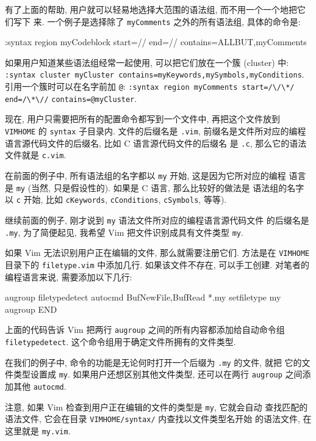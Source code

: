 有了上面的帮助, 用户就可以轻易地选择大范围的语法组, 而不用一个一个地把它们写下
来. 一个例子是选择除了 \texttt{myComments} 之外的所有语法组, 具体的命令是:
\begin{vimcode}
:syntax region myCodeblock start=/{/ end=/}/ contains=ALLBUT,myComments
\end{vimcode}

\begin{tips}
    如果用户知道某些语法组经常一起使用, 可以把它们放在一个簇 (cluster) 中:
    \texttt{:syntax cluster myCluster
    contains=myKeywords,mySymbols,myConditions}. 引用一个簇时可以在名字前加
    \verb'@': \texttt{:syntax region myComments start=}\verb'/\/\*/ end=/\*\//'
        \texttt{contains=@myCluster}.
\end{tips}

现在, 用户只需要把所有的配置命令都写到一个文件中, 再把这个文件放到
\texttt{VIMHOME} 的 \texttt{syntax} 子目录内. 文件的后缀名是 \texttt{.vim},
前缀名是文件所对应的编程语言源代码文件的后缀名, 比如 C 语言源代码文件的后缀名
是 \texttt{.c}, 那么它的语法文件就是 \texttt{c.vim}.

在前面的例子中, 所有语法组的名字都以 \texttt{my} 开始, 这是因为它所对应的编程
语言是 \texttt{my} (当然, 只是假设性的). 如果是 C 语言, 那么比较好的做法是
语法组的名字以 \texttt{c} 开始, 比如 \texttt{cKeywords}, \texttt{cConditions},
\texttt{cSymbols}, 等等).

继续前面的例子, 刚才说到 \texttt{my} 语法文件所对应的编程语言源代码文件
的后缀名是 \texttt{.my}, 为了简便起见, 我希望 Vim 把文件识别成具有文件类型
\texttt{my}.

如果 Vim 无法识别用户正在编辑的文件, 那么就需要注册它们. 方法是在
\texttt{VIMHOME} 目录下的 \texttt{filetype.vim} 中添加几行. 如果该文件不存在,
可以手工创建. 对笔者的编程语言来说, 需要添加以下几行:
\begin{vimcode}
augroup filetypedetect
autocmd BufNewFile,BufRead *.my setfiletype my
augroup END
\end{vimcode}
上面的代码告诉 Vim 把两行 \texttt{augroup} 之间的所有内容都添加给自动命令组
\texttt{filetypedetect}. 这个命令组用于确定文件所拥有的文件类型.

在我们的例子中, 命令的功能是无论何时打开一个后缀为 \texttt{.my} 的文件, 就把
它的文件类型设置成 \texttt{my}. 如果用户还想区别其他文件类型, 还可以在两行
\texttt{augroup} 之间添加其他 \texttt{autocmd}.

注意, 如果 Vim 检查到用户正在编辑的文件的类型是 \texttt{my}, 它就会自动
查找匹配的语法文件, 它会在目录 \texttt{VIMHOME/syntax/} 内查找以文件类型名开始
的语法文件, 在这里就是 \texttt{my.vim}.

